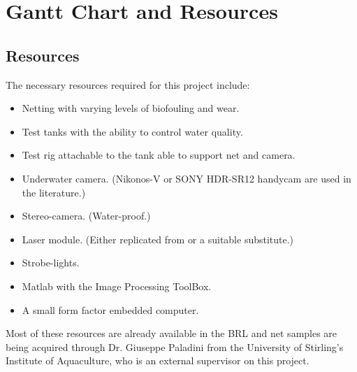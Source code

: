 \documentclass[11.5pt, twoside, a4paper]{article}
\begin{document}
\section{Gantt Chart and Resources}

\subsection{Resources}

The necessary resources required for this project include:
\begin{itemize}
\item Netting with varying levels of biofouling and wear.
\item Test tanks with the ability to control water quality.
\item Test rig attachable to the tank able to support net and camera.
\item Underwater camera. (Nikonos-V or  SONY HDR-SR12 handycam are used in the literature.)
\item Stereo-camera. (Water-proof.)
\item Laser module. (Either replicated from \cite{jakobsen2011automatic} or a suitable substitute.)
\item Strobe-lights.
\item Matlab with the Image Processing ToolBox.
\item A small form factor embedded computer.
\end{itemize}

Most of these resources are already available in the BRL and net samples are being acquired through Dr. Giuseppe Paladini from the University of Stirling’s Institute of Aquaculture, who is an
external supervisor on this project.
\end{document}
